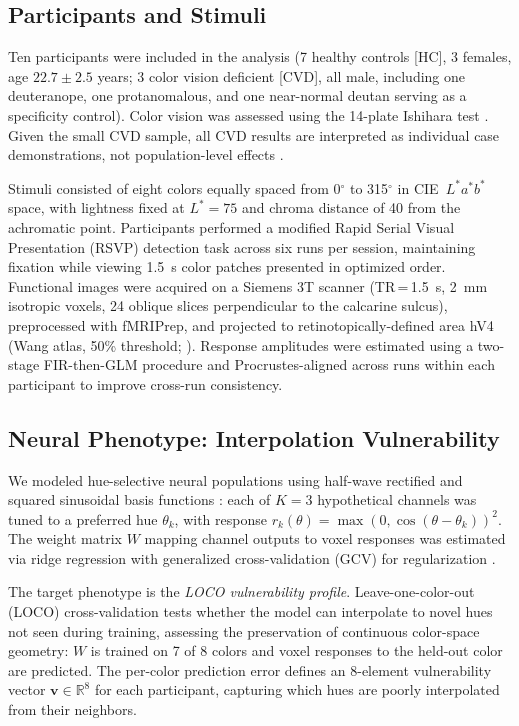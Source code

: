 \documentclass{article}
\begin{document}
\subsection{Participants and Stimuli}

Ten participants were included in the analysis (7 healthy controls [HC], 3 females, age $22.7 \pm 2.5$ years; 3 color vision deficient [CVD], all male, including one deuteranope, one protanomalous, and one near-normal deutan serving as a specificity control).
Color vision was assessed using the 14-plate Ishihara test \cite{placeholder_ishihara1917}.
Given the small CVD sample, all CVD results are interpreted as individual case demonstrations, not population-level effects \cite{placeholder_crawford1998}.

Stimuli consisted of eight colors equally spaced from 0$^\circ$ to 315$^\circ$ in CIE~$L^*a^*b^*$ space, with lightness fixed at $L^* = 75$ and chroma distance of 40 from the achromatic point.
Participants performed a modified Rapid Serial Visual Presentation (RSVP) detection task \cite{placeholder_brouwer2009} across six runs per session, maintaining fixation while viewing 1.5~s color patches presented in optimized order.
Functional images were acquired on a Siemens 3T scanner (TR\,=\,1.5~s, 2~mm isotropic voxels, 24 oblique slices perpendicular to the calcarine sulcus), preprocessed with fMRIPrep, and projected to retinotopically-defined area hV4 (Wang atlas, 50\% threshold; \citealt{placeholder_wang2015}).
Response amplitudes were estimated using a two-stage FIR-then-GLM procedure \cite{placeholder_brouwer2009} and Procrustes-aligned across runs within each participant to improve cross-run consistency.

\subsection{Neural Phenotype: Interpolation Vulnerability}

We modeled hue-selective neural populations using half-wave rectified and squared sinusoidal basis functions \cite{placeholder_brouwer2009}: each of $K{=}3$ hypothetical channels was tuned to a preferred hue $\theta_k$, with response $r_k(\theta) = \max(0, \cos(\theta - \theta_k))^2$.
The weight matrix $W$ mapping channel outputs to voxel responses was estimated via ridge regression with generalized cross-validation (GCV) for regularization \cite{placeholder_golub1979}.

The target phenotype is the \emph{LOCO vulnerability profile}.
Leave-one-color-out (LOCO) cross-validation tests whether the model can interpolate to novel hues not seen during training, assessing the preservation of continuous color-space geometry: $W$ is trained on 7 of 8 colors and voxel responses to the held-out color are predicted.
The per-color prediction error defines an 8-element vulnerability vector $\mathbf{v} \in \mathbb{R}^8$ for each participant, capturing which hues are poorly interpolated from their neighbors.
\end{document}
